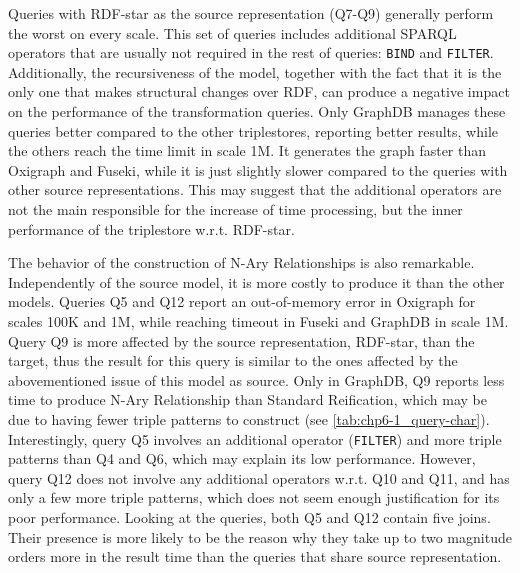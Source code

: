 Queries with RDF-star as the source representation (Q7-Q9) generally perform the worst on every scale. This set of queries includes additional SPARQL operators that are usually not required in the rest of queries: \texttt{BIND} and \texttt{FILTER}. Additionally, the recursiveness of the model, together with the fact that it is the only one that makes structural changes over RDF, can produce a negative impact on the performance of the transformation queries. Only GraphDB manages these queries better compared to the other triplestores, reporting better results, while the others reach the time limit in scale 1M. It generates the graph faster than Oxigraph and Fuseki, while it is just slightly slower compared to the queries with other source representations. This may suggest that the additional operators are not the main responsible for the increase of time processing, but the inner performance of the triplestore w.r.t. RDF-star.

The behavior of the construction of N-Ary Relationships is also remarkable. Independently of the source model, it is more costly to produce it than the other models. Queries Q5 and Q12 report an out-of-memory error in Oxigraph for scales 100K and 1M, while reaching timeout in Fuseki and GraphDB in scale 1M. Query Q9 is more affected by the source representation, RDF-star, than the target, thus the result for this query is similar to the ones affected by the abovementioned issue of this model as source. 
Only in GraphDB, Q9 reports less time to produce N-Ary Relationship than Standard Reification, which may be due to having fewer triple patterns to construct (see \cref{tab:chp6-1_query-char}). Interestingly, query Q5 involves an additional operator (\texttt{FILTER}) and more triple patterns than Q4 and Q6, which may explain its low performance. However, query Q12 does not involve any additional operators w.r.t. Q10 and Q11, and has only a few more triple patterns, which does not seem enough justification for its poor performance. Looking at the queries, both Q5 and Q12 contain five joins. Their presence is more likely to be the reason why they take up to two magnitude orders more in the result time than the queries that share source representation. 



